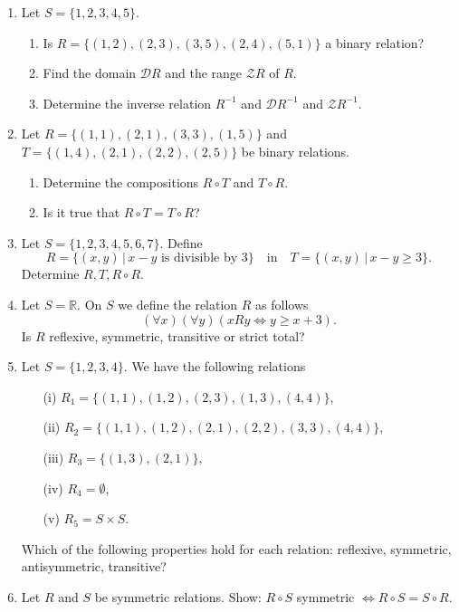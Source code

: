 \documentclass[11pt,paper=b5,footinclude,headinclude]{scrbook} %
\theoremstyle{remark}
\theoremstyle{definition} %
\theoremstyle{theorem} %
\begin{document}
\begin{enumerate}


\item Let $S=\{1,2,3,4,5\}$. 
\begin{enumerate}
    \item Is $R=\{(1,2),(2,3), (3,5), (2,4), (5,1)\}$ a binary relation?
    \item Find the domain $\mathcal{D} R$ and the range $\mathcal{Z} R$ of $R$.
    \item 
  Determine the inverse relation $R^{-1}$ and  $\mathcal{D} R^{-1}$ and  $\mathcal{Z} R^{-1}$.
\end{enumerate}

\item Let $R=\{(1,1),(2,1), (3,3), (1,5)\}$  and $T=\{(1,4),(2,1), (2,2), (2,5)\}$ be binary relations. \begin{enumerate}
    \item 
Determine the compositions $R\circ T$ and $T\circ R$. 
\item Is it true that $R\circ T = T \circ R$?
\end{enumerate}

\item Let  $S=\{1,2,3,4,5,6,7\}$. Define
$$R= \{(x,y)\,|\, x-y \textrm{ is divisible by  }  3\} \quad \mathrm{ in } \quad  T= \{(x,y)\,|\, x-y \geq 3\}.$$
Determine $R,T, R\circ R$.


\item Let  $S= \mathbb{R}$. On $S$ we define the relation $R$ as follows
$$(\forall x)(\forall y)(x R y \Leftrightarrow y \geq x +3).$$
Is $R$ reflexive, symmetric, transitive or strict total?

\item Let  $S=\{1,2,3,4\}$. We have the following relations
\begin{enumerate}
\item[(i)] $R_1= \{(1,1),(1,2),(2,3), (1,3), (4,4)\}$,
\item[(ii)] $R_2= \{(1,1),(1,2),(2,1), (2,2), (3,3), (4,4)\}$,
\item[(iii)] $R_3= \{(1,3),(2,1)\}$,
\item[(iv)] $R_4= \emptyset$,
\item[(v)] $R_5= S\times S$.
\end{enumerate}
Which of the following properties hold for each relation: reflexive, symmetric, antisymmetric, transitive?

\item Let $R$ and $S$ be symmetric relations. Show: $R\circ S$ symmetric $\Leftrightarrow R\circ S = S \circ R$.


\end{enumerate}
\end{document}
